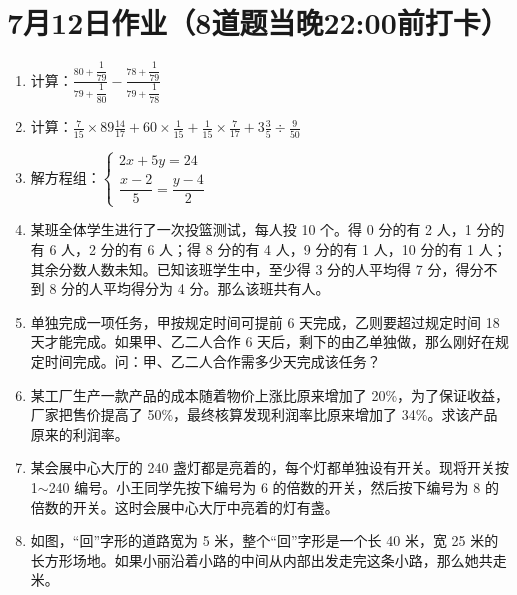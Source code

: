 \documentclass[UTF8,12pt,a4paper]{ctexart}
\newcommand{\BottomWriteSpace}{0.5cm}
\newenvironment{OnePageEightFill}{
  \small
  \vspace*{0pt}
  \begin{enumerate}[leftmargin=*, itemsep=0pt, topsep=0pt, parsep=0pt, partopsep=0pt]
  \setlength{\parskip}{0pt}
}{
  \end{enumerate}
  \vspace*{\BottomWriteSpace}
  \normalsize
  \newpage
}
\newcommand{\Q}[1]{\item #1\par\vfill}
\newcommand{\Qlast}[1]{\item #1\par}
\begin{document}
\section*{7月12日作业（8道题当晚22:00前打卡）}
\begin{OnePageEightFill}

\Q{计算：$\displaystyle \frac{80 + \dfrac{1}{79}}{79 + \dfrac{1}{80}} - \frac{78 + \dfrac{1}{79}}{79 + \dfrac{1}{78}}$}

\Q{计算：$\displaystyle \frac{7}{15} \times 89\frac{14}{17} + 60 \times \frac{1}{15} + \frac{1}{15} \times \frac{7}{17} + 3\frac{3}{5} \div \frac{9}{50}$}

\Q{解方程组：$\begin{cases} 2x + 5y = 24 \\ \dfrac{x-2}{5} = \dfrac{y-4}{2} \end{cases}$}

\Q{某班全体学生进行了一次投篮测试，每人投 10 个。得 0 分的有 2 人，1 分的有 6 人，2 分的有 6 人；得 8 分的有 4 人，9 分的有 1 人，10 分的有 1 人；其余分数人数未知。已知该班学生中，至少得 3 分的人平均得 7 分，得分不到 8 分的人平均得分为 4 分。那么该班共有\underline{\hspace{3em}}人。}

\Q{单独完成一项任务，甲按规定时间可提前 6 天完成，乙则要超过规定时间 18 天才能完成。如果甲、乙二人合作 6 天后，剩下的由乙单独做，那么刚好在规定时间完成。问：甲、乙二人合作需多少天完成该任务？}

\Q{某工厂生产一款产品的成本随着物价上涨比原来增加了 20\%，为了保证收益，厂家把售价提高了 50\%，最终核算发现利润率比原来增加了 34\%。求该产品原来的利润率。}

\Q{某会展中心大厅的 240 盏灯都是亮着的，每个灯都单独设有开关。现将开关按 1$\sim$240 编号。小王同学先按下编号为 6 的倍数的开关，然后按下编号为 8 的倍数的开关。这时会展中心大厅中亮着的灯有\underline{\hspace{3em}}盏。}

\Qlast{如图，“回”字形的道路宽为 5 米，整个“回”字形是一个长 40 米，宽 25 米的长方形场地。如果小丽沿着小路的中间从内部出发走完这条小路，那么她共走\underline{\hspace{3em}}米。}

\end{OnePageEightFill}
\end{document}
